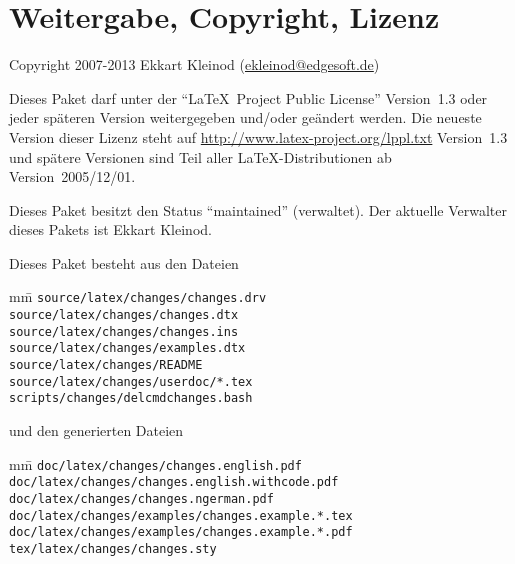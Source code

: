 \section{Weitergabe, Copyright, Lizenz}

Copyright 2007-2013 Ekkart Kleinod (\href{mailto:ekleinod@edgesoft.de}{ekleinod@edgesoft.de})

Dieses Paket darf unter der "`\LaTeX\ Project Public License"' Version~1.3 oder jeder späteren Version weitergegeben und/oder geändert werden.
Die neueste Version dieser Lizenz steht auf \url{http://www.latex-project.org/lppl.txt} Version~1.3 und spätere Versionen sind Teil aller \LaTeX-Distributionen ab Version~2005/12/01.

Dieses Paket besitzt den Status "`maintained"' (verwaltet).
Der aktuelle Verwalter dieses Pakets ist Ekkart Kleinod.

Dieses Paket besteht aus den Dateien

\begin{tabbing}
	mm\=\kill
	\>\texttt{source/latex/changes/changes.drv}\\
	\>\texttt{source/latex/changes/changes.dtx}\\
	\>\texttt{source/latex/changes/changes.ins}\\
	\>\texttt{source/latex/changes/examples.dtx}\\
	\>\texttt{source/latex/changes/README}\\
	\>\texttt{source/latex/changes/userdoc/*.tex}\\

	\>\texttt{scripts/changes/delcmdchanges.bash}
\end{tabbing}


und den generierten Dateien

\begin{tabbing}
	mm\=\kill
	\>\texttt{doc/latex/changes/changes.english.pdf}\\
	\>\texttt{doc/latex/changes/changes.english.withcode.pdf}\\
	\>\texttt{doc/latex/changes/changes.ngerman.pdf}\\

	\>\texttt{doc/latex/changes/examples/changes.example.*.tex}\\
	\>\texttt{doc/latex/changes/examples/changes.example.*.pdf}\\

	\>\texttt{tex/latex/changes/changes.sty}
\end{tabbing}



